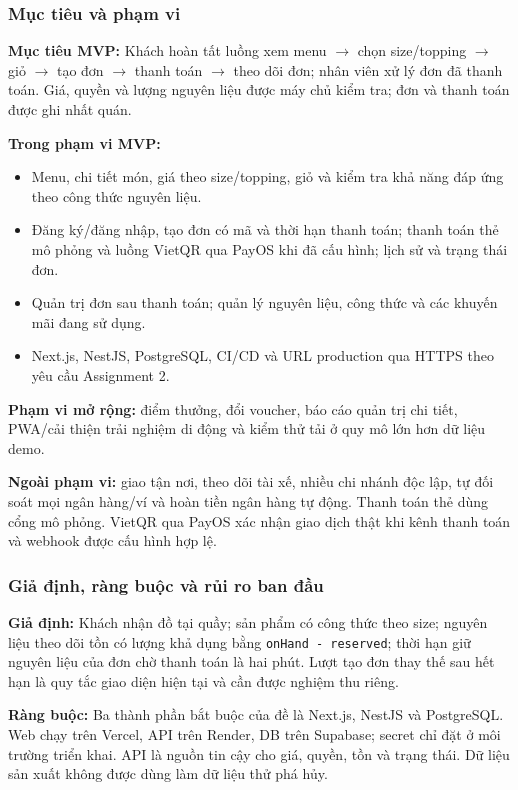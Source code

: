 \subsubsection{Mục tiêu và phạm vi}
\textbf{Mục tiêu MVP:} Khách hoàn tất luồng xem menu $\rightarrow$ chọn size/topping $\rightarrow$ giỏ $\rightarrow$ tạo đơn $\rightarrow$ thanh toán $\rightarrow$ theo dõi đơn; nhân viên xử lý đơn đã thanh toán. Giá, quyền và lượng nguyên liệu được máy chủ kiểm tra; đơn và thanh toán được ghi nhất quán.

\textbf{Trong phạm vi MVP:}
\begin{itemize}
  \item Menu, chi tiết món, giá theo size/topping, giỏ và kiểm tra khả năng đáp ứng theo công thức nguyên liệu.
  \item Đăng ký/đăng nhập, tạo đơn có mã và thời hạn thanh toán; thanh toán thẻ mô phỏng và luồng VietQR qua PayOS khi đã cấu hình; lịch sử và trạng thái đơn.
  \item Quản trị đơn sau thanh toán; quản lý nguyên liệu, công thức và các khuyến mãi đang sử dụng.
  \item Next.js, NestJS, PostgreSQL, CI/CD và URL production qua HTTPS theo yêu cầu Assignment 2.
\end{itemize}

\textbf{Phạm vi mở rộng:} điểm thưởng, đổi voucher, báo cáo quản trị chi tiết, PWA/cải thiện trải nghiệm di động và kiểm thử tải ở quy mô lớn hơn dữ liệu demo.

\textbf{Ngoài phạm vi:} giao tận nơi, theo dõi tài xế, nhiều chi nhánh độc lập, tự đối soát mọi ngân hàng/ví và hoàn tiền ngân hàng tự động. Thanh toán thẻ dùng cổng mô phỏng. VietQR qua PayOS xác nhận giao dịch thật khi kênh thanh toán và webhook được cấu hình hợp lệ.

\subsubsection{Giả định, ràng buộc và rủi ro ban đầu}
\textbf{Giả định:} Khách nhận đồ tại quầy; sản phẩm có công thức theo size; nguyên liệu theo dõi tồn có lượng khả dụng bằng \texttt{onHand - reserved}; thời hạn giữ nguyên liệu của đơn chờ thanh toán là hai phút. Lượt tạo đơn thay thế sau hết hạn là quy tắc giao diện hiện tại và cần được nghiệm thu riêng.

\textbf{Ràng buộc:} Ba thành phần bắt buộc của đề là Next.js, NestJS và PostgreSQL. Web chạy trên Vercel, API trên Render, DB trên Supabase; secret chỉ đặt ở môi trường triển khai. API là nguồn tin cậy cho giá, quyền, tồn và trạng thái. Dữ liệu sản xuất không được dùng làm dữ liệu thử phá hủy.

